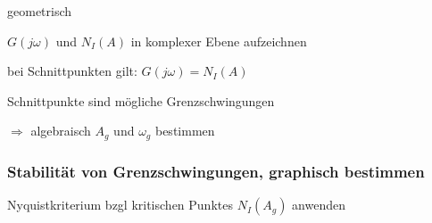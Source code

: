 \documentclass[german]{latex4ei/latex4ei_sheet}
\begin{document}
\begin{sectionbox}
\begin{cookbox}{geometrisch}
  \item $G(j \omega)$ und $N_I(A)$ in komplexer Ebene aufzeichnen
  \item bei Schnittpunkten gilt: $G(j \omega) = N_I(A)$
  \item Schnittpunkte sind mögliche Grenzschwingungen
  \item $\Rightarrow$ algebraisch $A_g$ und $\omega_g$ bestimmen
\end{cookbox}

\subsubsection{Stabilität von Grenzschwingungen, graphisch bestimmen}
Nyquistkriterium bzgl kritischen Punktes $N_I(A_g)$ anwenden
\end{sectionbox}
\end{document}
